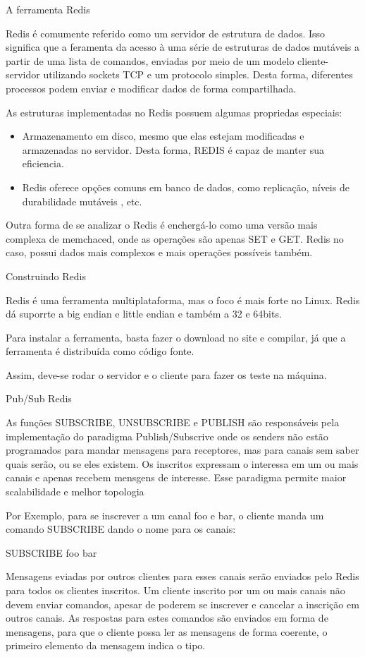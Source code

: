 \documentclass[12pt,a4paper]{article}
\begin{document}
A ferramenta Redis

Redis é comumente referido como um servidor de estrutura de dados. Isso significa que a feramenta da acesso à uma série de estruturas de dados mutáveis a partir de uma lista de comandos, enviadas por meio de um modelo cliente-servidor utilizando sockets TCP e um protocolo simples. Desta forma, diferentes processos podem enviar e modificar dados de forma compartilhada.

As estruturas implementadas no Redis possuem algumas propriedas especiais:

\begin{itemize}
\item Armazenamento em disco, mesmo que elas estejam modificadas e armazenadas no servidor. Desta forma, REDIS é capaz de manter sua eficiencia.
\item Redis oferece opções comuns em banco de dados, como replicação, níveis de durabilidade mutáveis , etc.
\end{itemize}

Outra forma de se analizar o Redis é enchergá-lo como uma versão mais complexa de memchaced, onde as operações são apenas SET e GET. Redis no caso, possui dados mais complexos e mais operações possíveis também.

Construindo Redis

Redis é uma ferramenta multiplataforma, mas o foco é mais forte no Linux. Redis dá suporrte a big endian e little endian e também a 32 e 64bits.

Para instalar a ferramenta, basta fazer o download no site e compilar, já que a ferramenta é distribuída como código fonte.

Assim, deve-se rodar o servidor e o cliente para fazer os teste na máquina.

Pub/Sub Redis

As funções SUBSCRIBE, UNSUBSCRIBE e PUBLISH são responsáveis pela implementação do paradigma Publish/Subscrive onde os senders não estão programados para mandar mensagens para receptores, mas para canais sem saber quais serão, ou se eles existem. Os inscritos expressam o interessa em um ou mais canais e apenas recebem mensgens de interesse. Esse paradigma permite maior scalabilidade e melhor topologia

Por Exemplo, para se inscrever a um canal foo e bar, o cliente manda um comando SUBSCRIBE  dando o nome para os canais:

SUBSCRIBE foo bar

Mensagens eviadas por outros clientes para esses canais serão enviados pelo Redis para todos os clientes inscritos.
Um cliente inscrito por um ou mais canais não devem enviar comandos, apesar de poderem se inscrever e cancelar a inscrição em outros canais. As respostas para estes comandos são enviados em forma de mensagens, para que o cliente possa ler as mensagens de forma coerente, o primeiro elemento da mensagem indica o tipo.
\end{document}

